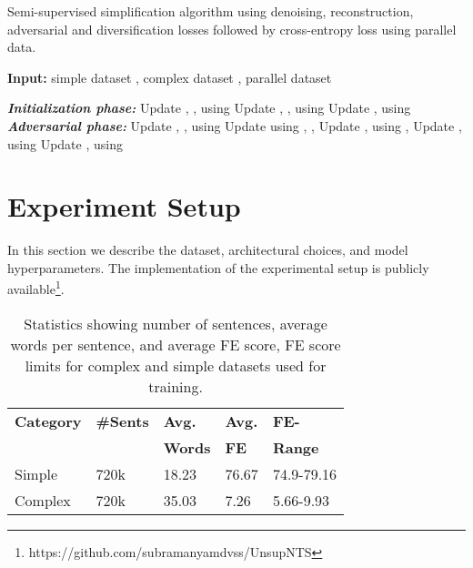\documentclass[11pt,a4paper]{article}
\begin{document}
\begin{algorithm}[h]
\caption{Semi-supervised simplification algorithm using denoising, reconstruction, adversarial and diversification losses followed by cross-entropy loss using parallel data. }
\label{algo:algo2}
\textbf{Input:} simple dataset , complex dataset , parallel dataset 
\begin{algorithmic}
\State \textbf{\textit{Initialization phase:}}
\Repeat
\State Update , ,  using 
\State Update , ,  using 
\State Update ,  using  
\State \textbf{\textit{Adversarial phase:}}
\Repeat
\State Update , ,  using 
\State Update  using , , 
\State Update ,  using , 
\State Update ,  using 
\State Update ,  using 
\end{algorithmic}
\end{algorithm}












 \section{Experiment Setup}
\label{sec:exp}
In this section we describe the dataset, architectural choices, and model hyperparameters. The implementation of the experimental setup is publicly available\footnote{https://github.com/subramanyamdvss/UnsupNTS}.
\begin{table}[t]
\centering
\footnotesize
\begin{tabular}{lllll}
    \toprule
    \textbf{Category} & \textbf{\#Sents} & \textbf{Avg.} & \textbf{Avg.} & \textbf{FE-} \\
     & & \textbf{Words} & \textbf{FE} & \textbf{Range} \\
    \midrule
    Simple  & 720k & 18.23 & 76.67 & 74.9-79.16\\
    Complex & 720k & 35.03 & 7.26 & 5.66-9.93\\
    \bottomrule
\end{tabular}
\caption{Statistics showing number of sentences, average words per sentence, and average FE score, FE score limits for complex and simple datasets used for training.}
\label{tab:datastat}
\end{table}
\end{document}
